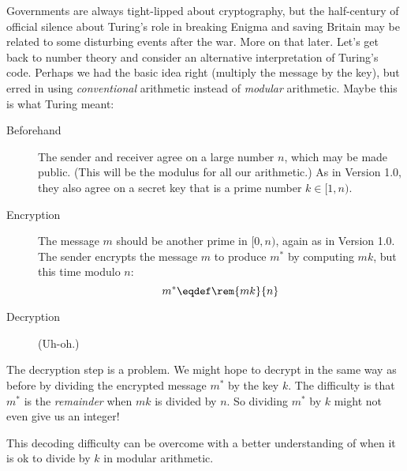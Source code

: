 Governments are always tight-lipped about cryptography, but the
half-century of official silence about Turing's role in breaking
Enigma and saving Britain may be related to some disturbing events
after the war.  More on that later.  Let's get back to number theory
and consider an alternative interpretation of Turing's code.  Perhaps
we had the basic idea right (multiply the message by the key), but
erred in using \emph{conventional} arithmetic instead of
\emph{modular} arithmetic.  Maybe this is what Turing meant:
\begin{description}

\item[Beforehand] The sender and receiver agree on a large number $n$,
  which may be made public.  (This will be the modulus for all our
  arithmetic.)  As in Version 1.0, they also agree on a secret key
  that is a prime number $k \in [1, n)$.

\item[Encryption] The message $m$ should be another prime in $[0, n)$,
  again as in Version 1.0.  The sender encrypts the message $m$ to
  produce $m^*$ by computing $mk$, but this time modulo $n$:
\begin{equation}
m^* \eqdef \rem{mk}{n} \label{eq:turing-code}
\end{equation}

\item[Decryption] (Uh-oh.)

\end{description}

The decryption step is a problem.  We might hope to decrypt in the
same way as before by dividing the encrypted message $m^*$ by the key
$k$.  The difficulty is that $m^*$ is the \emph{remainder} when $mk$
is divided by $n$.  So dividing $m^*$ by $k$ might not even give us an
integer!

This decoding difficulty can be overcome with a better understanding
of when it is ok to divide by $k$ in modular arithmetic.

\begin{problems}
\practiceproblems
{}

\homeworkproblems
{}

\classproblems
{}

\examproblems
{}
\end{problems}

